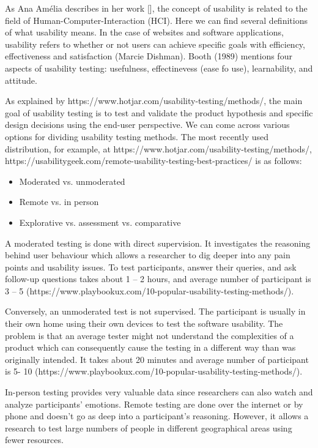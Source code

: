 \documentclass[a4paper,10pt,twoside]{article}
\begin{document}
\noindent As Ana Amélia describes in her work [], the concept of usability is related to the field of Human-Computer-Interaction (HCI). Here we can find several definitions of what usability means. In the case of websites and software applications, usability refers to whether or not users can achieve specific goals with efficiency, effectiveness and satisfaction (Marcie Dishman). Booth (1989) mentions four aspects of usability testing: usefulness, effectinevess (ease fo use), learnability, and attitude.

As explained by https://www.hotjar.com/usability-testing/methods/, the main goal of usability testing is to test and validate the product hypothesis and specific design decisions using the end-user perspective. We can come across various options for dividing usability testing methods. The most recently used distribution, for example, at https://www.hotjar.com/usability-testing/methods/, https://usabilitygeek.com/remote-usability-testing-best-practices/ is as follows:

\begin{itemize}
\item	Moderated vs. unmoderated
\item	Remote vs. in person
\item	Explorative vs. assessment vs. comparative
\end{itemize}

\noindent A moderated testing is done with direct supervision. It investigates the reasoning behind user behaviour which allows a researcher to dig deeper into any pain points and usability issues. To test participants, answer their queries, and ask follow-up questions takes about 1 – 2 hours, and average number of participant is 3 – 5 (https://www.playbookux.com/10-popular-usability-testing-methods/). 

Conversely, an unmoderated test is not supervised. The participant is usually in their own home using their own devices to test the software usability. The problem is that an average tester might not understand the complexities of a product which can consequently cause the testing in a different way than was originally intended. It takes about 20 minutes and average number of participant is 5- 10 (https://www.playbookux.com/10-popular-usability-testing-methods/).

In-person testing provides very valuable data since researchers can also watch and analyze participants’ emotions. 
Remote testing are done over the internet or by phone and doesn’t go as deep into a participant’s reasoning. However, it allows a research to test large numbers of people in different geographical areas using fewer resources.
\end{document}
